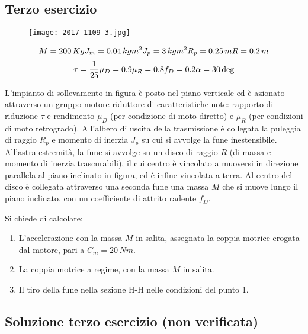 \documentclass[main.tex]{subfiles}
\begin{document}
\subsection{Terzo esercizio}

\begin{figure}[H]
\centering
\texttt{[image: 2017-1109-3.jpg]}
\end{figure}

\[
	M = 200\,Kg\\
	J_m = 0.04\,kgm^2\\
	J_p = 3\,kgm^2\\
	R_p = 0.25\,m\\
	R = 0.2\,m\\
\]
\[
	\tau = \dfrac{1}{25}\\
	\mu_D = 0.9\\
	\mu_R = 0.8\\
	f_D = 0.2\\
	\alpha = 30\deg
\]

L'impianto di sollevamento in figura è posto nel piano verticale ed è azionato attraverso un gruppo motore-riduttore di caratteristiche note: rapporto di riduzione $\tau$ e rendimento $\mu_D$ (per condizione di moto diretto) e $\mu_R$ (per condizioni di moto retrogrado).
All'albero di uscita della trasmissione è collegata la puleggia di raggio $R_p$ e momento di inerzia $J_p$ su cui si avvolge la fune inestensibile.
All'astra estremità, la fune si avvolge su un disco di raggio $R$ (di massa e momento di inerzia trascurabili), il cui centro è vincolato  a muoversi in direzione parallela al piano inclinato in figura, ed è infine vincolata a terra.
Al centro del disco è collegata attraverso una seconda fune una massa $M$ che si muove lungo il piano inclinato, con un coefficiente di attrito radente $f_D$.

Si chiede di calcolare:

\begin{enumerate}
\item L'accelerazione con la massa $M$ in salita, assegnata la coppia motrice erogata dal motore, pari a $C_m = 20\,Nm$.
\item La coppia motrice a regime, con la massa $M$ in salita.
\item Il tiro della fune nella sezione H-H nelle condizioni del punto 1.
\end{enumerate}

\clearpage

\subsection{Soluzione terzo esercizio (non verificata)}
\end{document}
